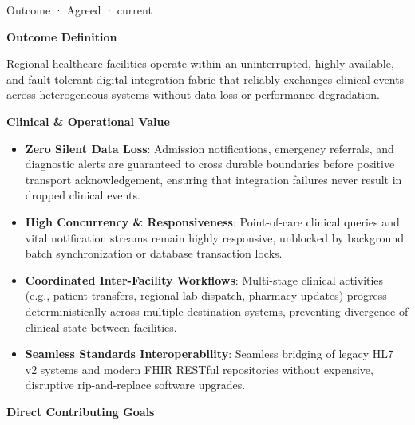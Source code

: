 \label{element:aed90b4a88f24b78adfeadbf0bca8980}
{\small Outcome · Agreed · current}\par

\par\medskip\textbf{Outcome Definition}\par


Regional healthcare facilities operate within an uninterrupted, highly available, and fault-tolerant digital integration fabric that reliably exchanges clinical events across heterogeneous systems without data loss or performance degradation.



\par\medskip\textbf{Clinical \& Operational Value}\par


\begin{itemize}


\item \textbf{Zero Silent Data Loss}: Admission notifications, emergency referrals, and diagnostic alerts are guaranteed to cross durable boundaries before positive transport acknowledgement, ensuring that integration failures never result in dropped clinical events.

\item \textbf{High Concurrency \& Responsiveness}: Point-of-care clinical queries and vital notification streams remain highly responsive, unblocked by background batch synchronization or database transaction locks.

\item \textbf{Coordinated Inter-Facility Workflows}: Multi-stage clinical activities (e.g., patient transfers, regional lab dispatch, pharmacy updates) progress deterministically across multiple destination systems, preventing divergence of clinical state between facilities.

\item \textbf{Seamless Standards Interoperability}: Seamless bridging of legacy HL7 v2 systems and modern FHIR RESTful repositories without expensive, disruptive rip-and-replace software upgrades.

\end{itemize}


\par\medskip\textbf{Direct Contributing Goals}\par


